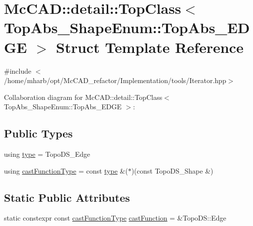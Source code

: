 \hypertarget{structMcCAD_1_1detail_1_1TopClass_3_01TopAbs__ShapeEnum_1_1TopAbs__EDGE_01_4}{}\section{Mc\+C\+AD\+:\+:detail\+:\+:Top\+Class$<$ Top\+Abs\+\_\+\+Shape\+Enum\+:\+:Top\+Abs\+\_\+\+E\+D\+GE $>$ Struct Template Reference}
\label{structMcCAD_1_1detail_1_1TopClass_3_01TopAbs__ShapeEnum_1_1TopAbs__EDGE_01_4}


{\ttfamily \#include $<$/home/mharb/opt/\+Mc\+C\+A\+D\+\_\+refactor/\+Implementation/tools/\+Iterator.\+hpp$>$}



Collaboration diagram for Mc\+C\+AD\+:\+:detail\+:\+:Top\+Class$<$ Top\+Abs\+\_\+\+Shape\+Enum\+:\+:Top\+Abs\+\_\+\+E\+D\+GE $>$\+:
\subsection*{Public Types}
\begin{DoxyCompactItemize}
\item 
using \hyperlink{structMcCAD_1_1detail_1_1TopClass_3_01TopAbs__ShapeEnum_1_1TopAbs__EDGE_01_4_af60bbd5885a56b23758c4f5bf62c825c}{type} = Topo\+D\+S\+\_\+\+Edge
\item 
using \hyperlink{structMcCAD_1_1detail_1_1TopClass_3_01TopAbs__ShapeEnum_1_1TopAbs__EDGE_01_4_a692e71e44ee1f17df116b0a80675aec2}{cast\+Function\+Type} = const \hyperlink{structMcCAD_1_1detail_1_1TopClass_3_01TopAbs__ShapeEnum_1_1TopAbs__EDGE_01_4_af60bbd5885a56b23758c4f5bf62c825c}{type} \&($\ast$)(const Topo\+D\+S\+\_\+\+Shape \&)
\end{DoxyCompactItemize}
\subsection*{Static Public Attributes}
\begin{DoxyCompactItemize}
\item 
static constexpr const \hyperlink{structMcCAD_1_1detail_1_1TopClass_3_01TopAbs__ShapeEnum_1_1TopAbs__EDGE_01_4_a692e71e44ee1f17df116b0a80675aec2}{cast\+Function\+Type} \hyperlink{structMcCAD_1_1detail_1_1TopClass_3_01TopAbs__ShapeEnum_1_1TopAbs__EDGE_01_4_ae430ba75c17344a9752b75a8d6686bd6}{cast\+Function} = \&Topo\+D\+S\+::\+Edge
\end{DoxyCompactItemize}


